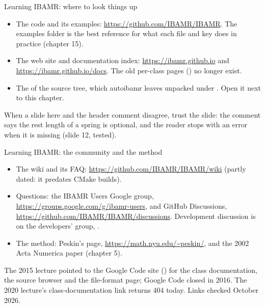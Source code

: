 \documentclass[aspectratio=169,11pt]{beamer}
\begin{document}
\begin{frame}{Learning IBAMR: where to look things up}
\begin{itemize}
  \item The code and its examples: \url{https://github.com/IBAMR/IBAMR}. The examples folder is the best reference for what each file and key does in practice (chapter 15).
  \item The web site and documentation index: \url{https://ibamr.github.io} and \url{https://ibamr.github.io/docs}. The old per-class pages () no longer exist.
  \item The   of the source tree, which autoibamr leaves unpacked under . Open it next to this chapter.
\end{itemize}
\vspace{2mm}
\begin{punchbox}
\small When a slide here and the header comment disagree, trust the slide: the comment says the rest length of a spring is optional, and the reader stops with an error when it is missing (slide 12, tested).
\end{punchbox}
\end{frame}

\begin{frame}{Learning IBAMR: the community and the method}
\begin{itemize}
  \item The wiki and its FAQ: \url{https://github.com/IBAMR/IBAMR/wiki} (partly dated: it predates CMake builds).
  \item Questions: the IBAMR Users Google group, \url{https://groups.google.com/g/ibamr-users}, and GitHub Discussions, \url{https://github.com/IBAMR/IBAMR/discussions}. Development discussion is on the developers' group, .
  \item The method: Peskin's page, \url{https://math.nyu.edu/~peskin/}, and the 2002 Acta Numerica paper (chapter 5).
\end{itemize}
\vspace{2mm}
\small The 2015 lecture pointed to the Google Code site () for the class documentation, the source browser and the file-format page; Google Code closed in 2016. The 2020 lecture's class-documentation link returns 404 today. Links checked October 2026.
\end{frame}
\end{document}
